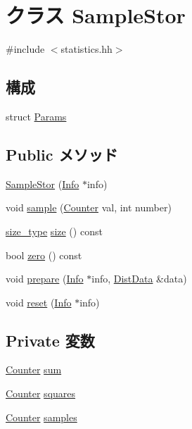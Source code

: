 \hypertarget{classStats_1_1SampleStor}{
\section{クラス SampleStor}
\label{classStats_1_1SampleStor}
}


{\ttfamily \#include $<$statistics.hh$>$}\subsection*{構成}
\begin{DoxyCompactItemize}
\item 
struct \hyperlink{structStats_1_1SampleStor_1_1Params}{Params}
\end{DoxyCompactItemize}
\subsection*{Public メソッド}
\begin{DoxyCompactItemize}
\item 
\hyperlink{classStats_1_1SampleStor_a864d8d22bc6b7acd98e34ae38ea2b5b7}{SampleStor} (\hyperlink{classStats_1_1Info}{Info} $\ast$info)
\item 
void \hyperlink{classStats_1_1SampleStor_a57fea70de4ed8fee9ec9e9d9cca6f9fa}{sample} (\hyperlink{namespaceStats_ac35128c026c72bb36af9cea00774e8a6}{Counter} val, int number)
\item 
\hyperlink{namespaceStats_ada51e68d31936547d3729c82daf6b7c6}{size\_\-type} \hyperlink{classStats_1_1SampleStor_a503ab01f6c0142145d3434f6924714e7}{size} () const 
\item 
bool \hyperlink{classStats_1_1SampleStor_a4e72b01b727d3165e75cba84eb507491}{zero} () const 
\item 
void \hyperlink{classStats_1_1SampleStor_a2e5e3cd36b4a3d6ab774aed4e3fcd641}{prepare} (\hyperlink{classStats_1_1Info}{Info} $\ast$info, \hyperlink{structStats_1_1DistData}{DistData} \&data)
\item 
void \hyperlink{classStats_1_1SampleStor_a10d9d71be6e0d2194999bb5dd5280e2d}{reset} (\hyperlink{classStats_1_1Info}{Info} $\ast$info)
\end{DoxyCompactItemize}
\subsection*{Private 変数}
\begin{DoxyCompactItemize}
\item 
\hyperlink{namespaceStats_ac35128c026c72bb36af9cea00774e8a6}{Counter} \hyperlink{classStats_1_1SampleStor_ab5b201cce7e10c48f62b71605e75707e}{sum}
\item 
\hyperlink{namespaceStats_ac35128c026c72bb36af9cea00774e8a6}{Counter} \hyperlink{classStats_1_1SampleStor_a0c02ec1e072d692448ce4429a78e3675}{squares}
\item 
\hyperlink{namespaceStats_ac35128c026c72bb36af9cea00774e8a6}{Counter} \hyperlink{classStats_1_1SampleStor_ab4db99aba3dd28686061dd3d5475b3bd}{samples}
\end{DoxyCompactItemize}


